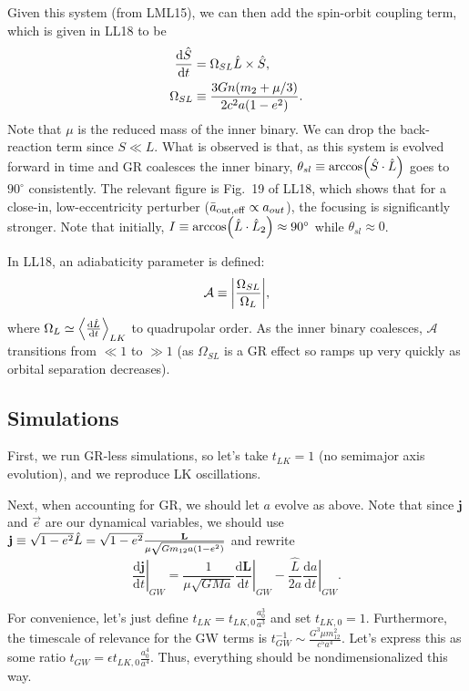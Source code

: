 \documentclass[11pt,
        usenames, %
        dvipsnames %
    ]{article}
\newcommand*{\rd}[2]{\frac{\mathrm{d}#1}{\mathrm{d}#2}}
\newcommand*{\bm}[1]{\boldsymbol{\mathbf{#1}}}
\newcommand*{\at}[1]{\left.#1\right|}
\DeclarePairedDelimiter\abs{\lvert}{\rvert}
\DeclarePairedDelimiter\ev{\langle}{\rangle}
\DeclarePairedDelimiter\p{\lparen}{\rparen}
\begin{document}
Given this system (from LML15), we can then add the spin-orbit coupling term,
which is given in LL18 to be
\begin{align}
    \rd{\hat{S}}{t} &= \Omega_{SL}\hat{L} \times \hat{S},\\
    \Omega_{SL} &\equiv \frac{3Gn\p*{m_2 + \mu/3}}{2c^2a\p*{1 - e^2}}.
\end{align}
Note that $\mu$ is the reduced mass of the inner binary. We can drop the
back-reaction term since $S \ll L$. What is observed is that, as this system
is evolved forward in time and GR coalesces the inner binary, $\theta_{sl}
\equiv \arccos\p*{\hat{S} \cdot \hat{L}}$ goes to $90^\circ$ consistently. The
relevant figure is Fig.~19 of LL18, which shows that for a close-in,
low-eccentricity perturber ($\bar{a}_{\rm out, eff} \propto a_{out}$), the
focusing is significantly stronger. Note that initially, $I \equiv
\arccos\p*{\hat{L} \cdot \hat{L}_2} \approx 90^\circ$ while $\theta_{sl}
\approx 0$.

In LL18, an adiabaticity parameter is defined:
\begin{equation}
    \mathcal{A} \equiv \abs*{\frac{\Omega_{SL}}{\Omega_L}},
\end{equation}
where $\Omega_{L} \simeq \ev*{\rd{\hat{L}}{t}}_{LK}$ to quadrupolar order. As
the inner binary coalesces, $\mathcal{A}$ transitions from $\ll 1$ to $\gg 1$
(as $\Omega_{SL}$ is a GR effect so ramps up very quickly as orbital separation
decreases).

\subsection{Simulations}

First, we run GR-less simulations, so let's take $t_{LK} = 1$ (no semimajor axis
evolution), and we reproduce LK oscillations.

Next, when accounting for GR, we should let $a$ evolve as above. Note that since
$\bm{j}$ and $\vec{e}$ are our dynamical variables, we should use $\bm{j} \equiv
\sqrt{1 - e^2} \hat{L} = \sqrt{1 - e^2}\frac{\bm{L}}{\mu \sqrt{Gm_{12}a\p*{1 -
e^2}}}$ and rewrite
\begin{equation}
    \at{\rd{\bm{j}}{t}}_{GW} = \frac{1}{\mu\sqrt{GMa}}\at{\rd{\bm{L}}{t}}_{GW}
        - \frac{\hat{L}}{2a}\at{\rd{a}{t}}_{GW}.
\end{equation}

For convenience, let's just define $t_{LK} = t_{LK,0} \frac{a_0^3}{a^3}$
and set $t_{LK, 0} = 1$. Furthermore, the timescale of relevance for the GW
terms is $t_{GW}^{-1} \sim \frac{G^3 \mu m_{12}^2}{c^5a^4}$. Let's express this
as some ratio $t_{GW} = \epsilon t_{LK, 0}\frac{a_0^4}{a^4}$. Thus, everything
should be nondimensionalized this way.
\end{document}
